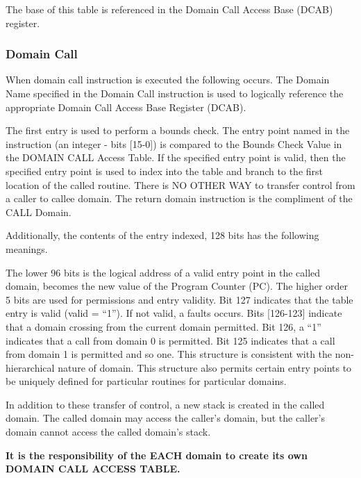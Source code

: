 \documentclass{article}
\begin{document}
		                 
		                 
The base of this table is referenced in the Domain Call  Access Base (DCAB) register. 


		                 
		                 
		                 
\subsubsection{Domain Call}		     
		                 
When domain call instruction is executed the following occurs.  The Domain Name specified in the Domain Call instruction  is used to logically reference the appropriate Domain Call Access Base Register (DCAB).

The first entry is used to perform a bounds check.  The entry point named  in the instruction (an integer - bits [15-0]) is compared to the Bounds Check  Value in  the DOMAIN CALL Access Table.  If  the specified entry point is valid,  then   the specified entry  point is used to index into the table and branch to the first location of the called routine.  There is NO OTHER WAY to transfer control from a caller to callee domain. The return domain instruction is the compliment of the CALL Domain. 

Additionally,  the  contents of the entry indexed,  128 bits has the following meanings.  

The lower 96 bits is the logical address of a valid entry point in the called domain,  becomes the new  value of the Program Counter (PC).  The higher order 5 bits are used for permissions and entry validity.  Bit 127 indicates that the table entry is valid (valid  =  “1”).  If not valid, a faults occurs. Bits [126-123]  indicate that a domain crossing from the current domain permitted.  Bit 126,  a “1” indicates that a call from domain 0 is permitted.  Bit 125 indicates that a call from domain 1 is permitted and so one. This structure is consistent with the non-hierarchical nature of domain.  This structure also permits certain entry points to be uniquely defined for particular routines for particular domains.



In addition to these transfer of control, a new stack is created  in the called domain.  The called domain may access the caller’s domain,  but the caller’s domain cannot access the called domain’s stack.


\textbf{It is the responsibility of the EACH domain to create its own DOMAIN CALL ACCESS TABLE.}
\end{document}
